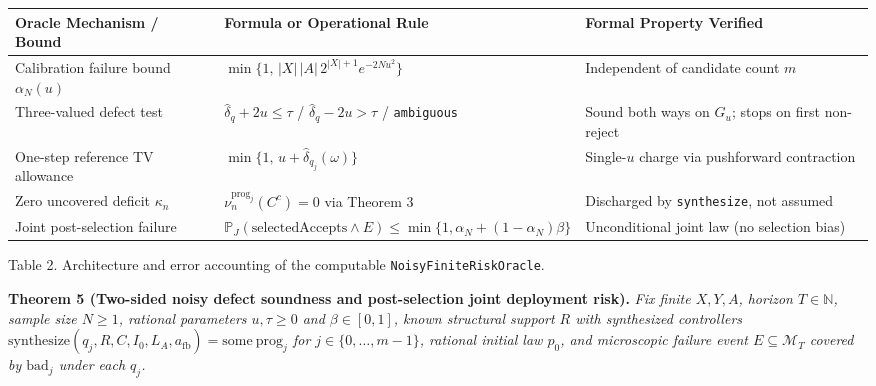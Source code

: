 \documentclass[11pt,a4paper]{article}
\newcounter{none}
\begin{document}
{\def\LTcaptype{none} %
\begin{longtable}[]{@{}
  >{\raggedright\arraybackslash}p{}
  >{\raggedright\arraybackslash}p{}
  >{\raggedright\arraybackslash}p{}@{}}
\toprule\noalign{}
\begin{minipage}[b]{\linewidth}\raggedright
Oracle Mechanism / Bound
\end{minipage} & \begin{minipage}[b]{\linewidth}\raggedright
Formula or Operational Rule
\end{minipage} & \begin{minipage}[b]{\linewidth}\raggedright
Formal Property Verified
\end{minipage} \\
\midrule\noalign{}
\endhead
\bottomrule\noalign{}
\endlastfoot
Calibration failure bound \(\alpha_N(u)\) &
\(\min\{1,\, |X|\,|A|\, 2^{|X|+1} e^{-2Nu^2}\}\) & Independent of
candidate count \(m\) \\
Three-valued defect test & \(\widehat{\delta}_q + 2u \le \tau\) /
\(\widehat{\delta}_q - 2u > \tau\) / \texttt{ambiguous} & Sound both
ways on \(G_u\); stops on first non-reject \\
One-step reference TV allowance &
\(\min\{1,\, u + \widehat{\delta}_{q_j}(\omega)\}\) & Single-\(u\)
charge via pushforward contraction \\
Zero uncovered deficit \(\kappa_n\) &
\(\nu_n^{\mathrm{prog}_j}(C^c) = 0\) via Theorem 3 & Discharged by
\texttt{synthesize}, not assumed \\
Joint post-selection failure &
\(\mathbb{P}_J(\mathrm{selectedAccepts} \land E) \le \min\{1, \alpha_N + (1-\alpha_N)\beta\}\)
& Unconditional joint law (no selection bias) \\
\end{longtable}
}

Table 2. Architecture and error accounting of the computable
\texttt{NoisyFiniteRiskOracle}.

\textbf{Theorem 5 (Two-sided noisy defect soundness and post-selection
joint deployment risk).} \emph{Fix finite \(X, Y, A\), horizon
\(T \in \mathbb{N}\), sample size \(N \ge 1\), rational parameters
\(u, \tau \ge 0\) and \(\beta \in [0,1]\), known structural support
\(R\) with synthesized controllers
\(\mathrm{synthesize}(q_j, R, C, I_0, L_A, a_{\mathrm{fb}}) = \mathrm{some\ prog}_j\)
for \(j \in \{0, \dots, m-1\}\), rational initial law \(p_0\), and
microscopic failure event \(E \subseteq \mathcal{M}_T\) covered by
\(\mathrm{bad}_j\) under each \(q_j\).}
\end{document}
